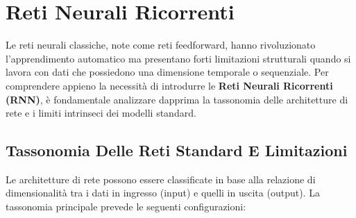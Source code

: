 ﻿\documentclass[11pt, a4paper]{article}
\author{Francesco Lo Verde}
\begin{document}
\section{Reti Neurali Ricorrenti}

Le reti neurali classiche, note come reti feedforward, hanno rivoluzionato l'apprendimento automatico ma presentano forti limitazioni strutturali quando si lavora con dati che possiedono una dimensione temporale o sequenziale. Per comprendere appieno la necessità di introdurre le \textbf{Reti Neurali Ricorrenti (RNN)}, è fondamentale analizzare dapprima la tassonomia delle architetture di rete e i limiti intrinseci dei modelli standard.


\subsection{Tassonomia Delle Reti Standard E Limitazioni}

Le architetture di rete possono essere classificate in base alla relazione di dimensionalità tra i dati in ingresso (input) e quelli in uscita (output). La tassonomia principale prevede le seguenti configurazioni:


\end{document}
